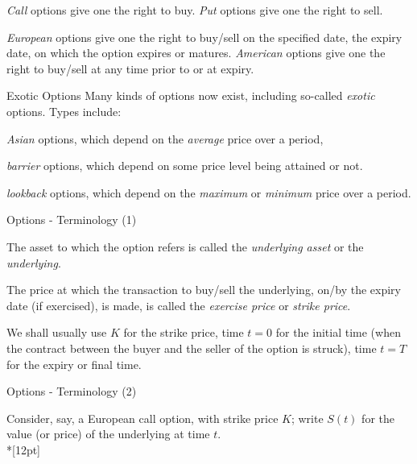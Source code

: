 	{\it Call} options give one
the right to buy. {\it Put} options give one the right to sell.


	{\it European} options give one the right to buy/sell on the
specified date, the expiry date, on which the option expires or
matures. {\it American} options give one the right to buy/sell at any time
prior to or at expiry.





{Exotic Options}
Many kinds of options now exist, including so-called {\it exotic}
options.  Types include:






	{\it Asian} options, which depend on the
{\it average} price over a period,


	{\it barrier} options, which depend on some price level being
attained or not.


	{\it lookback} options, which
depend on the  {\it maximum} or {\it minimum} price over a period.





{Options - Terminology (1)}







	The asset to which the option refers is called the {\it underlying
asset} or the {\it underlying}.


	
The price at which the transaction
to buy/sell the underlying, on/by the expiry date (if exercised),
is made, is called the {\it exercise price} or {\it strike price}.


	We shall usually use $K$ for the strike price, time $t = 0$ for
the initial time (when the contract between the buyer and the
seller of the option is struck), time $t = T$ for the expiry or
final time.





{Options - Terminology (2)}

Consider, say, a European call option, with strike price $K$;
write $S(t)$ for the value (or price) of the underlying at time
$t$.\\*[12pt]







